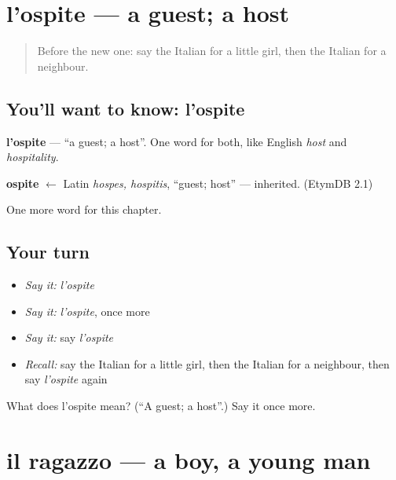 \section[l'ospite]{l'ospite — a guest; a host}

\label{lesson:IT-C46-ospite}



\begin{quote}
Before the new one: say the Italian for a little girl, then the Italian for a neighbour.
\end{quote}

\subsection*{You'll want to know: l'ospite}
\textbf{l'ospite} — \textquotedblleft{}a guest; a host\textquotedblright{}. One word for both, like English \emph{host} and \emph{hospitality}.

\begin{cousinweb}
\textbf{ospite} $\leftarrow$ Latin \emph{hospes, hospitis}, \textquotedblleft{}guest; host\textquotedblright{} — inherited. (EtymDB 2.1)
\end{cousinweb}

\begin{grammarlens}[title={What you've built}]
One more word for this chapter.
\end{grammarlens}

\subsection*{Your turn}
\begin{itemize}
\raggedright
  \item \emph{Say it:} \emph{l'ospite}
  \item \emph{Say it:} \emph{l'ospite}, once more
  \item \emph{Say it:} say \emph{l'ospite}
  \item \emph{Recall:} say the Italian for a little girl, then the Italian for a neighbour, then say \emph{l'ospite} again
\end{itemize}

\begin{tcolorbox}[breakable,colback=teal!4,colframe=teal!35!black,title={Before you move on}]
What does l'ospite mean? (\textquotedblleft{}A guest; a host\textquotedblright{}.) Say it once more.
\end{tcolorbox}
\section[il ragazzo]{il ragazzo — a boy, a young man}

